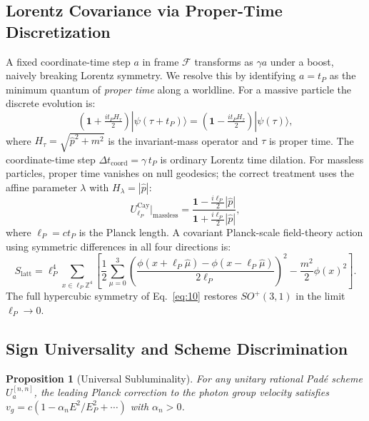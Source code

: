 \documentclass[11pt,a4paper]{article}
\newtheorem{proposition}{Proposition}
\begin{document}
\subsection{Lorentz Covariance via Proper-Time Discretization}

A fixed coordinate-time step $a$ in frame $\mathcal{F}$ transforms as $\gamma a$ under a boost, naively breaking Lorentz symmetry. We resolve this by identifying $a = t_P$ as the minimum quantum of \emph{proper time} along a worldline. For a massive particle the discrete evolution is:
\begin{equation}
  \left(\mathbf{1} + \tfrac{it_P H_\tau}{2}\right)|\psi(\tau + t_P)\rangle = \left(\mathbf{1} - \tfrac{it_P H_\tau}{2}\right)|\psi(\tau)\rangle,
  \label{eq:8}
\end{equation}
where $H_\tau = \sqrt{\hat{p}^2 + m^2}$ is the invariant-mass operator and $\tau$ is proper time. The coordinate-time step $\Delta t_{\mathrm{coord}} = \gamma\, t_P$ is ordinary Lorentz time dilation. For massless particles, proper time vanishes on null geodesics; the correct treatment uses the affine parameter $\lambda$ with $H_\lambda = |\hat{p}|$:
\begin{equation}
  U_{\ell_P}^{\mathrm{Cay}}\big|_{\mathrm{massless}} = \frac{\mathbf{1} - \tfrac{i\ell_P}{2}|\hat{p}|}{\mathbf{1} + \tfrac{i\ell_P}{2}|\hat{p}|},
  \label{eq:9}
\end{equation}
where $\ell_P = ct_P$ is the Planck length. A covariant Planck-scale field-theory action using symmetric differences in all four directions is:
\begin{equation}
  S_{\mathrm{latt}} = \ell_P^4 \sum_{x \in \ell_P\mathbb{Z}^4} \left[\frac{1}{2}\sum_{\mu=0}^{3}\!\left(\frac{\phi(x+\ell_P\hat{\mu})-\phi(x-\ell_P\hat{\mu})}{2\ell_P}\right)^{\!2} - \frac{m^2}{2}\phi(x)^2\right].
  \label{eq:10}
\end{equation}
The full hypercubic symmetry of Eq.~\eqref{eq:10} restores $SO^+(3,1)$ in the limit $\ell_P \to 0$.

\subsection{Sign Universality and Scheme Discrimination}

\begin{proposition}[Universal Subluminality]
For any unitary rational Pad\'{e} scheme $U_a^{[n,n]}$, the leading Planck correction to the photon group velocity satisfies $v_g = c(1 - \alpha_n E^2/E_P^2 + \cdots)$ with $\alpha_n > 0$.
\end{proposition}
\end{document}
